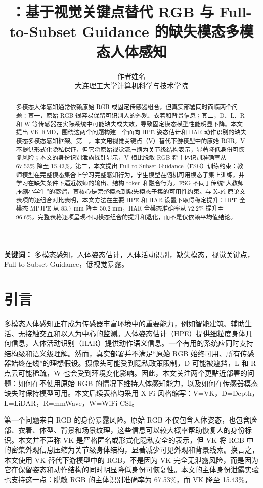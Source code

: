 ﻿\documentclass[UTF8,twocolumn]{ctexart}
\title{\method：基于视觉关键点替代 RGB 与 Full-to-Subset Guidance 的缺失模态多模态人体感知}
\author{作者姓名\\大连理工大学计算机科学与技术学院}
\date{}
\newcommand{\method}{VK-RMD}
\newcommand{\mpjpe}{MPJPE}
\newcommand{\modLegend}{V=VK，D=Depth，L=LiDAR，R=mmWave，W=WiFi-CSI。}
\begin{document}
\maketitle

\begin{abstract}
多模态人体感知通常依赖原始 RGB 或固定传感器组合，但真实部署同时面临两个问题：其一，原始 RGB 很容易保留可识别人的外观、衣着和背景信息；其二，D、L、R 和 W 等传感器在实际系统中可能缺失或失效，导致固定模态模型性能明显下降。本文提出 \method{}，围绕这两个问题构建一个面向 HPE 姿态估计和 HAR 动作识别的缺失模态多模态感知框架。第一，本文用视觉关键点（V）替代下游模型中的原始 RGB。V 不提供形式化隐私保证，但它将原始视觉流压缩为关节级结构表示，显著降低身份可恢复风险；本文的身份识别泄露探针显示，V 相比脱敏 RGB 将主体识别准确率从 67.53\% 降至 15.43\%。第二，本文提出 Full-to-Subset Guidance（FSG）训练约束：教师模型在完整模态集合上学习完整感知行为，学生模型在随机可用模态子集上训练，并学习在缺失条件下逼近教师的输出、结构 token 和融合行为。FSG 不同于传统“大教师压缩小学生”的蒸馏，其核心是完整模态到缺失模态子集的可用性约束。与 X-Fi 原论文表项的逐组合对比表明，本文方法在主要 HPE 和 HAR 设置下取得稳定提升：HPE 全模态 \mpjpe{} 从 83.7 mm 降至 50.2 mm，HAR 全模态准确率从 72.2\% 提升至 96.6\%。完整表格逐项呈现不同模态组合的提升和退化，而不是仅依赖平均值结论。
\end{abstract}

\textbf{关键词：} 多模态感知，人体姿态估计，人体活动识别，缺失模态，视觉关键点，Full-to-Subset Guidance，低视觉暴露。

\section{引言}
多模态人体感知正在成为传感器丰富环境中的重要能力，例如智能建筑、辅助生活、无接触交互和以人为中心的监测。人体姿态估计（HPE）提供细粒度身体几何信息，人体活动识别（HAR）提供动作语义信息。一个有用的系统应同时支持结构级和语义级理解。然而，真实部署并不满足“原始 RGB 始终可用、所有传感器始终在线”的理想假设。摄像头可能受到隐私政策限制，D 可能被遮挡，L 和 R 点云可能稀疏，W 也会受到环境变化影响。因此，本文关注两个更贴近部署的问题：如何在不使用原始 RGB 的情况下维持人体感知能力，以及如何在传感器模态缺失时保持模型可用。本文后续表格均采用 X-Fi 风格缩写：\modLegend

第一个问题来自 RGB 的身份暴露风险。原始 RGB 不仅包含人体姿态，也包含脸部、衣着、体型、背景和场景纹理，这些信息可以较大概率帮助恢复人的身份标识。本文并不声称 VK 是严格匿名或形式化隐私安全的表示，但 VK 将 RGB 中的密集外观信息压缩为关节级身体结构，显著减少可见外观和背景线索。换言之，本文使用 VK 替代下游模型中的 RGB，不是因为 VK 完全无泄露风险，而是因为它在保留姿态和动作结构的同时明显降低身份可恢复性。本文的主体身份泄露实验也支持这一点：脱敏 RGB 的主体识别准确率为 67.53\%，而 VK 降至 15.43\%。
\end{document}
